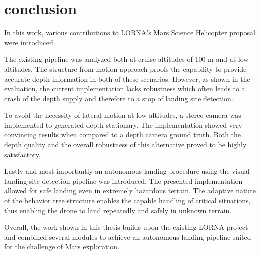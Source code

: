 \chapter{conclusion}
\label{sec:conclusion}

In this work, various contributions to LORNA's Mars Science Helicopter proposal were introduced.

The existing pipeline was analyzed both at cruise altitudes of 100 m and at low altitudes. The structure from motion approach proofs the capability to provide accurate depth information in both of these scenarios. However, as shown in the evaluation, the current implementation lacks robustness which often leads to a crash of the depth supply and therefore to a stop of landing site detection. 

To avoid the necessity of lateral motion at low altitudes, a stereo camera was implemented to generated depth stationary. The implementation showed very convincing results when compared to a depth camera ground truth. Both the depth quality and the overall robustness of this alternative proved to be highly satisfactory.

Lastly and most importantly an autonomous landing procedure using the visual landing site detection pipeline was introduced. The presented implementation allowed for safe landing even in extremely hazardous terrain. The adaptive nature of the behavior tree structure enables the capable handling of critical situations, thus enabling the drone to land repeatedly and safely in unknown terrain.

Overall, the work shown in this thesis builds upon the existing LORNA project and combined several modules to achieve an autonomous landing pipeline suited for the challenge of Mars exploration. 